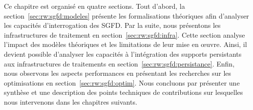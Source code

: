 Ce chapitre est organisé en quatre sections. Tout d'abord, la section~\ref{sec:rw:sgfd:modeles} présente les formalisations théoriques afin d'analyser les capacités d'interrogation des SGFD. Par la suite, nous présentons les infrastructures de traitement en section~\ref{sec:rw:sgfd:infra}. Cette section analyse l'impact des modèles théoriques et les limitations de leur mise en œuvre. Ainsi, il devient possible d'analyser les capacités à l'intégration des supports persistants aux infrastructures de traitements en section~\ref{sec:rw:sgfd:persistance}. Enfin, nous observons les aspects performances en présentant les recherches sur les optimisations en section~\ref{sec:rw:sgfd:optim}. Nous concluons par présenter une synthèse et une description des points techniques de contributions sur lesquelles nous intervenons dans les chapitres suivants.






